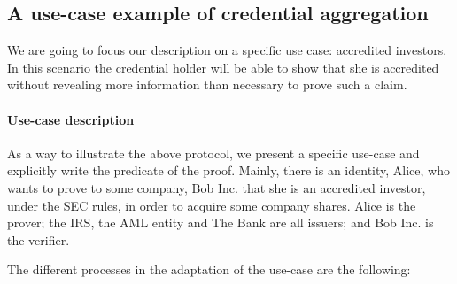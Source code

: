 \subsection{A use-case example of credential aggregation}
\label{sec:apps:id-framework:use-case-credential-aggregation}

We are going to focus our description on a specific use case: accredited investors. 
In this scenario the credential holder will be able to show that she is accredited without revealing more information than necessary to prove such a claim. 

\paragraph{Use-case description}
As a way to illustrate the above protocol, we present a specific use-case and explicitly write the predicate of the proof. Mainly, there is an identity, Alice, who wants to prove to some company, Bob Inc. that she is an accredited investor, under the SEC rules, in order to acquire some company shares. Alice is the prover; the IRS, the AML entity and The Bank are all issuers; and Bob Inc. is the verifier.

The different processes in the adaptation of the use-case are the following:

